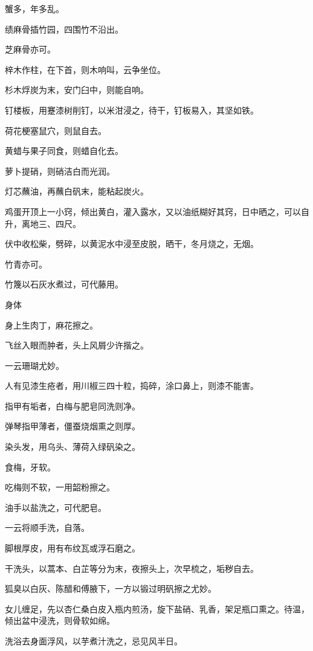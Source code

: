 \documentclass[a4paper,12pt,UTF8,twoside]{ctexbook}
\begin{document}
    蟹多，年多乱。
    
    绩麻骨插竹园，四围竹不沿出。
    
    芝麻骨亦可。
    
    梓木作柱，在下首，则木响叫，云争坐位。
    
    杉木烰炭为末，安门臼中，则能自响。
    
    钉楼板，用蹇漆树削钉，以米泔浸之，待干，钉板易入，其坚如铁。
    
    荷花梗塞鼠穴，则鼠自去。
    
    黄蜡与果子同食，则蜡自化去。
    
    萝卜提硝，则硝洁白而光润。
    
    灯芯蘸油，再蘸白矾末，能粘起炭火。
    
    鸡蛋开顶上一小窍，倾出黄白，灌入露水，又以油纸糊好其窍，日中晒之，可以自升，离地三、四尺。
    
    伏中收松柴，劈碎，以黄泥水中浸至皮脱，晒干，冬月烧之，无烟。
    
    竹青亦可。
    
    竹篾以石灰水煮过，可代藤用。
    
    身体
    
    身上生肉丁，麻花擦之。
    
    飞丝入眼而肿者，头上风屑少许揩之。
    
    一云珊瑚尤妙。
    
    人有见漆生疮者，用川椒三四十粒，捣碎，涂口鼻上，则漆不能害。
    
    指甲有垢者，白梅与肥皂同洗则净。
    
    弹琴指甲薄者，僵蚕烧烟熏之则厚。
    
    染头发，用乌头、薄荷入绿矾染之。
    
    食梅，牙软。
    
    吃梅则不软，一用韶粉擦之。
    
    油手以盐洗之，可代肥皂。
    
    一云将顺手洗，自落。
    
    脚根厚皮，用有布纹瓦或浮石磨之。
    
    干洗头，以蒿本、白芷等分为末，夜擦头上，次早梳之，垢秽自去。
    
    狐臭以白灰、陈醋和傅腋下，一方以锻过明矾擦之尤妙。
    
    女儿缠足，先以杏仁桑白皮入瓶内煎汤，旋下盐硝、乳香，架足瓶口熏之。待温，倾出盆中浸洗，则骨软如绵。
    
    洗浴去身面浮风，以芋煮汁洗之，忌见风半日。
    
\end{document}
